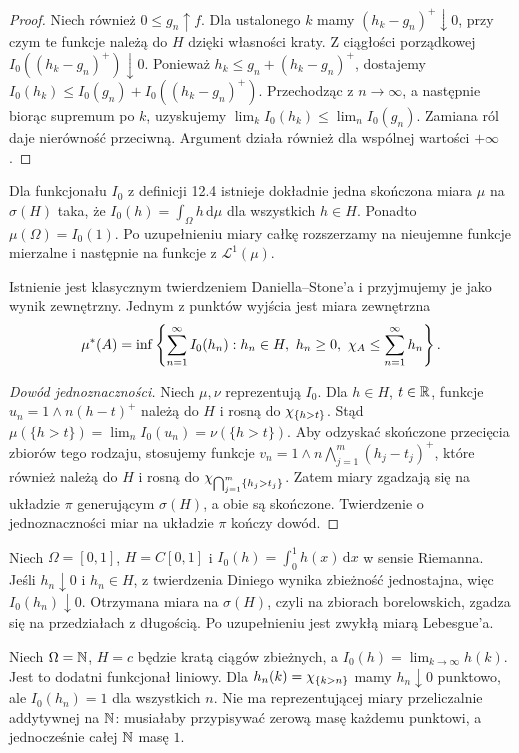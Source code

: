 \begin{proof}
Niech również $0\le g_n\uparrow f$. Dla ustalonego $k$ mamy $(h_k-g_n)^+\downarrow0$, przy czym te funkcje należą do $H$ dzięki własności kraty. Z ciągłości porządkowej $I_0((h_k-g_n)^+)\downarrow0$. Ponieważ $h_k\le g_n+(h_k-g_n)^+$, dostajemy $I_0(h_k)\le I_0(g_n)+I_0((h_k-g_n)^+)$. Przechodząc z $n\to\infty$, a następnie biorąc supremum po $k$, uzyskujemy $\lim_kI_0(h_k)\le\lim_nI_0(g_n)$. Zamiana ról daje nierówność przeciwną. Argument działa również dla wspólnej wartości $+\infty$.
\end{proof}
\begin{twierdzenie}
Dla funkcjonału $I_0$ z definicji 12.4 istnieje dokładnie jedna skończona miara $\mu$ na $\sigma(H)$ taka, że $I_0(h)=\int_\Omega h\,\mathrm d\mu$ dla wszystkich $h\in H$. Ponadto $\mu(\Omega)=I_0(1)$. Po uzupełnieniu miary całkę rozszerzamy na nieujemne funkcje mierzalne i następnie na funkcje z $\mathcal L^1(\mu)$.
\end{twierdzenie}
Istnienie jest klasycznym twierdzeniem Daniella--Stone'a i przyjmujemy je jako wynik zewnętrzny. Jednym z punktów wyjścia jest miara zewnętrzna
\[
\mu^*(A)=\inf\left\{\sum_{n=1}^\infty I_0(h_n):h_n\in H,\ h_n\ge0,\ \chi_{A}\le\sum_{n=1}^\infty h_n\right\}.
\]
\begin{proof}[Dowód jednoznaczności]
Niech $\mu,\nu$ reprezentują $I_0$. Dla $h\in H$, $t\in\mathbb R$, funkcje $u_n=1\wedge n(h-t)^+$ należą do $H$ i rosną do $\chi_{\{h>t\}}$. Stąd $\mu(\{h>t\})=\lim_nI_0(u_n)=\nu(\{h>t\})$. Aby odzyskać skończone przecięcia zbiorów tego rodzaju, stosujemy funkcje $v_n=1\wedge n\bigwedge_{j=1}^m(h_j-t_j)^+$, które również należą do $H$ i rosną do $\chi_{\bigcap_{j=1}^m\{h_j>t_j\}}$. Zatem miary zgadzają się na układzie $\pi$ generującym $\sigma(H)$, a obie są skończone. Twierdzenie o jednoznaczności miar na układzie $\pi$ kończy dowód.
\end{proof}
\begin{przyklad}
Niech $\Omega=[0,1]$, $H=C[0,1]$ i $I_0(h)=\int_0^1h(x)\,\mathrm dx$ w sensie Riemanna. Jeśli $h_n\downarrow0$ i $h_n\in H$, z twierdzenia Diniego wynika zbieżność jednostajna, więc $I_0(h_n)\downarrow0$. Otrzymana miara na $\sigma(H)$, czyli na zbiorach borelowskich, zgadza się na przedziałach z długością. Po uzupełnieniu jest zwykłą miarą Lebesgue'a.
\end{przyklad}
\begin{przyklad}
Niech $\Omega=\mathbb N$, $H=c$ będzie kratą ciągów zbieżnych, a $I_0(h)=\lim_{k\to\infty}h(k)$. Jest to dodatni funkcjonał liniowy. Dla $h_n(k)=\chi_{\{k>n\}}$ mamy $h_n\downarrow0$ punktowo, ale $I_0(h_n)=1$ dla wszystkich $n$. Nie ma reprezentującej miary przeliczalnie addytywnej na $\mathbb N$: musiałaby przypisywać zerową masę każdemu punktowi, a jednocześnie całej $\mathbb N$ masę $1$.
\end{przyklad}

